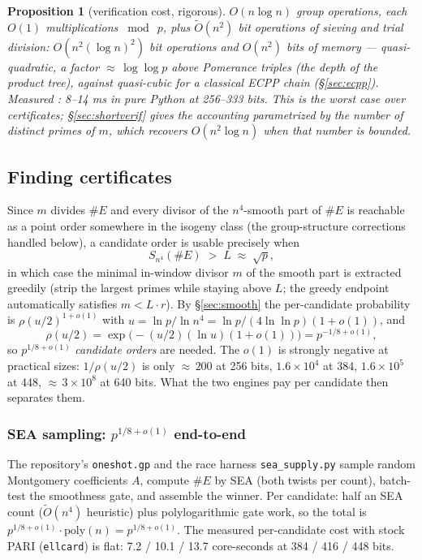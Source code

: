 \documentclass[11pt]{amsart}
\newcommand{\Ot}{\widetilde{O}}
\newcommand{\smoothpart}[2]{S_{#1}(#2)}
\newcommand{\osf}{\cite{OSF}}
\theoremstyle{plain}
\newtheorem{proposition}[theorem]{Proposition}
\theoremstyle{definition}
\theoremstyle{remark}
\begin{document}
\begin{proposition}[verification cost, rigorous]\label{prop:oneshotverif}
$O(n\log n)$ group operations, each $O(1)$ multiplications $\bmod\ p$, plus $\Ot(n^2)$ bit operations of
sieving and trial division: $O(n^2(\log n)^2)$ bit operations and $O(n^2)$ bits of memory ---
quasi-quadratic, a factor ${\approx}\,\log\log p$ above Pomerance triples (the depth of the product
tree), against quasi-cubic for a classical ECPP chain (\S\ref{sec:ecpp}).  Measured \osf: 8--14 ms in
pure Python at 256--333 bits.  This is the worst case over certificates; \S\ref{sec:shortverif} gives
the accounting parametrized by the number of distinct primes of $m$, which recovers $O(n^2\log n)$ when
that number is bounded.
\end{proposition}

\subsection{Finding certificates}\label{sec:oneshotfind}

Since $m$ divides $\#E$ and every divisor of the $n^4$-smooth part of $\#E$ is reachable as a point
order somewhere in the isogeny class (the group-structure corrections handled below), a candidate
order is usable precisely when
\[
  \smoothpart{n^4}{\#E} \;>\; L \;\approx\; \sqrt p,
\]
in which case the minimal in-window divisor $m$ of the smooth part is extracted greedily (strip the
largest primes while staying above $L$; the greedy endpoint automatically satisfies $m < L\cdot r$).  By
\S\ref{sec:smooth} the per-candidate probability is $\rho(u/2)^{1+o(1)}$ with
$u = \ln p/\ln n^4 = \ln p/(4\ln\ln p)(1+o(1))$, and
\[
  \rho(u/2) = \exp\bigl(-(u/2)(\ln u)(1+o(1))\bigr) = p^{-1/8+o(1)},
\]
so $p^{1/8+o(1)}$ \emph{candidate orders} are needed.  The $o(1)$ is strongly negative at practical
sizes: $1/\rho(u/2)$ is only ${\approx}\,200$ at 256 bits, $1.6\times 10^4$ at 384, $1.6\times 10^5$ at
448, ${\approx}\,3\times 10^8$ at 640 bits.  What the two engines pay per candidate then separates
them.

\subsubsection{SEA sampling: \texorpdfstring{$p^{1/8+o(1)}$}{p\string^(1/8+o(1))} end-to-end}
The repository's \texttt{oneshot.gp} and the race harness \texttt{sea\_supply.py} \osf{} sample random
Montgomery coefficients $A$, compute $\#E$ by SEA (both twists per count), batch-test the smoothness
gate, and assemble the winner.  Per candidate: half an SEA count ($\Ot(n^4)$ heuristic) plus
polylogarithmic gate work, so the total is $p^{1/8+o(1)}\cdot\mathrm{poly}(n) = p^{1/8+o(1)}$.  The
measured per-candidate cost with stock PARI (\texttt{ellcard}) is flat: 7.2 / 10.1 / 13.7 core-seconds
at 384 / 416 / 448 bits.
\end{document}
